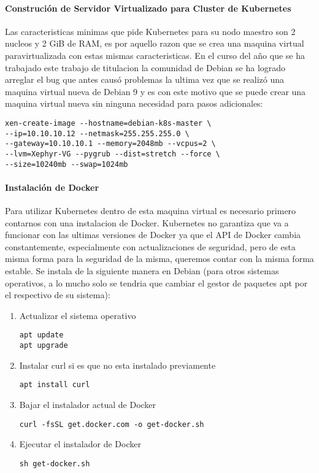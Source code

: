 \paragraph{Construción de Servidor Virtualizado para Cluster de Kubernetes}
Las caracteristicas minimas que pide Kubernetes para su nodo maestro son 2 nucleos y 2 GiB de RAM, es por aquello razon que se crea una maquina virtual paravirtualizada con estas mismas caracteristicas. En el curso del año que se ha trabajado este trabajo de titulacion la comunidad de Debian se ha logrado arreglar  el bug que antes causó problemas la ultima vez que se realizó una maquina virtual nueva de Debian 9 y es con este motivo que se puede crear una maquina virtual nueva sin ninguna necesidad para pasos adicionales:
\begin{lstlisting}
xen-create-image --hostname=debian-k8s-master \
--ip=10.10.10.12 --netmask=255.255.255.0 \
--gateway=10.10.10.1 --memory=2048mb --vcpus=2 \
--lvm=Xephyr-VG --pygrub --dist=stretch --force \
--size=10240mb --swap=1024mb
\end{lstlisting}

\paragraph{Instalación de Docker}
Para utilizar Kubernetes dentro de esta maquina virtual es necesario primero contarnos con una instalacion de Docker. Kubernetes no garantiza que va a funcionar con las ultimas versiones de Docker ya que el API de Docker cambia constantemente, especialmente con actualizaciones de seguridad, pero de esta misma forma para la seguridad de la misma, queremos contar con la misma forma estable. Se instala de la siguiente manera en Debian (para otros sistemas operativos, a lo mucho solo se tendria que cambiar el gestor de paquetes apt por el respectivo de su sistema):
\begin{enumerate}
	\item Actualizar el sistema operativo
    \begin{lstlisting}
apt update
apt upgrade
    \end{lstlisting}
    \item Instalar curl si es que no esta instalado previamente
    \begin{lstlisting}
apt install curl
    \end{lstlisting}
    \item Bajar el instalador actual de Docker
    \begin{lstlisting}
curl -fsSL get.docker.com -o get-docker.sh
    \end{lstlisting}
    \item Ejecutar el instalador de Docker
    \begin{lstlisting}
sh get-docker.sh
    \end{lstlisting}
\end{enumerate}

